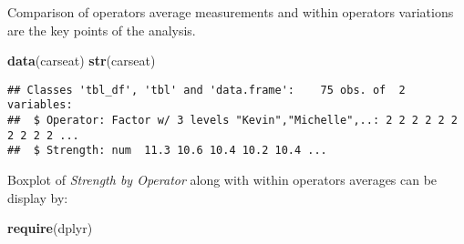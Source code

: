 \documentclass[]{book}
\newenvironment{Shaded}{\begin{snugshade}}{\end{snugshade}}
\newcommand{\KeywordTok}[1]{\textcolor[rgb]{0.13,0.29,0.53}{\textbf{{#1}}}}
\newcommand{\DataTypeTok}[1]{\textcolor[rgb]{0.13,0.29,0.53}{{#1}}}
\newcommand{\DecValTok}[1]{\textcolor[rgb]{0.00,0.00,0.81}{{#1}}}
\newcommand{\StringTok}[1]{\textcolor[rgb]{0.31,0.60,0.02}{{#1}}}
\newcommand{\CommentTok}[1]{\textcolor[rgb]{0.56,0.35,0.01}{\textit{{#1}}}}
\newcommand{\NormalTok}[1]{{#1}}
\begin{document}
Comparison of operators average measurements and within operators
variations are the key points of the analysis.

\begin{Shaded}
\begin{Highlighting}[]
\KeywordTok{data}\NormalTok{(carseat)}
\KeywordTok{str}\NormalTok{(carseat)}
\end{Highlighting}
\end{Shaded}

\begin{verbatim}
## Classes 'tbl_df', 'tbl' and 'data.frame':    75 obs. of  2 variables:
##  $ Operator: Factor w/ 3 levels "Kevin","Michelle",..: 2 2 2 2 2 2 2 2 2 2 ...
##  $ Strength: num  11.3 10.6 10.4 10.2 10.4 ...
\end{verbatim}

Boxplot of \emph{Strength by Operator} along with within operators
averages can be display by:

\begin{Shaded}
\begin{Highlighting}[]
\KeywordTok{require}\NormalTok{(dplyr)}
\end{Highlighting}
\end{Shaded}

\begin{Shaded}
\end{Shaded}
\end{document}
